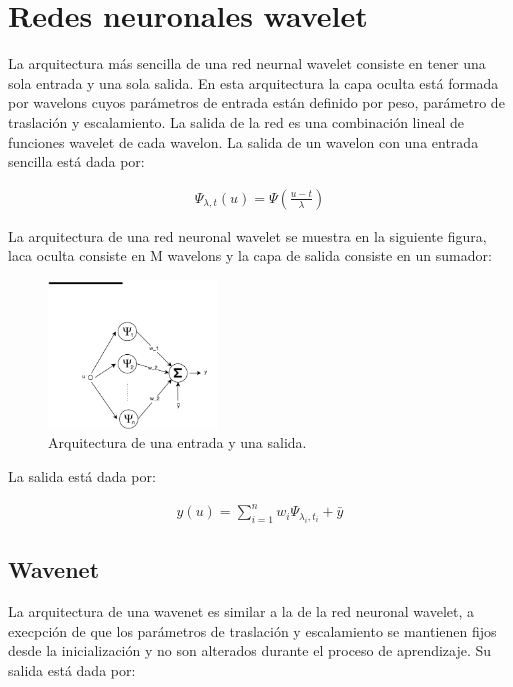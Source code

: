 \section{Redes neuronales wavelet}
La arquitectura más sencilla de una red neurnal wavelet consiste en tener una
sola entrada y una sola salida. En esta arquitectura la capa oculta está
formada por wavelons cuyos parámetros de entrada están definido por peso,
parámetro de traslación y escalamiento. La salida de la red es una combinación
lineal de funciones wavelet de cada wavelon. La salida de un wavelon con una
entrada sencilla está dada por:

\begin{eqnarray*}
    \Psi_{\lambda,t}(u) = \Psi\left(\frac{u-t}{\lambda}\right)
\end{eqnarray*}

La arquitectura de una red neuronal wavelet se muestra en la siguiente figura,
laca oculta consiste en M wavelons y la capa de salida consiste en un sumador:

\begin{figure}[h!t]
    \begin{center}
        \includegraphics[width=0.4\textwidth]{images/1_in_1_out}
        \caption{Arquitectura de una entrada y una salida.}
    \end{center}
\end{figure}

La salida está dada por:

\begin{eqnarray*}
    y(u) = \sum_{i=1}^{n} w_i\Psi_{\lambda_i,t_i} + \bar{y}
\end{eqnarray*}

\subsection{Wavenet}
La arquitectura de una wavenet es similar a la de la red neuronal wavelet, a
execpción de que los parámetros de traslación y escalamiento se mantienen fijos
desde la inicialización y no son alterados durante el proceso de aprendizaje.
Su salida está dada por:

